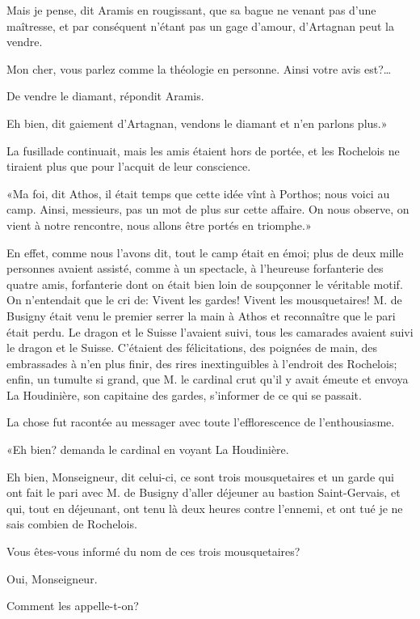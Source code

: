 \speak  Mais je pense, dit Aramis en rougissant, que sa bague ne venant pas d'une maîtresse, et par conséquent n'étant pas un gage d'amour, d'Artagnan peut la vendre. 

\speak  Mon cher, vous parlez comme la théologie en personne. Ainsi votre avis est?\dots 

\speak  De vendre le diamant, répondit Aramis. 

\speak  Eh bien, dit gaiement d'Artagnan, vendons le diamant et n'en parlons plus.» 

La fusillade continuait, mais les amis étaient hors de portée, et les Rochelois ne tiraient plus que pour l'acquit de leur conscience. 

«Ma foi, dit Athos, il était temps que cette idée vînt à Porthos; nous voici au camp. Ainsi, messieurs, pas un mot de plus sur cette affaire. On nous observe, on vient à notre rencontre, nous allons être portés en triomphe.» 

En effet, comme nous l'avons dit, tout le camp était en émoi; plus de deux mille personnes avaient assisté, comme à un spectacle, à l'heureuse forfanterie des quatre amis, forfanterie dont on était bien loin de soupçonner le véritable motif. On n'entendait que le cri de: Vivent les gardes! Vivent les mousquetaires! M. de Busigny était venu le premier serrer la main à Athos et reconnaître que le pari était perdu. Le dragon et le Suisse l'avaient suivi, tous les camarades avaient suivi le dragon et le Suisse. C'étaient des félicitations, des poignées de main, des embrassades à n'en plus finir, des rires inextinguibles à l'endroit des Rochelois; enfin, un tumulte si grand, que M. le cardinal crut qu'il y avait émeute et envoya La Houdinière, son capitaine des gardes, s'informer de ce qui se passait. 

La chose fut racontée au messager avec toute l'efflorescence de l'enthousiasme. 

«Eh bien? demanda le cardinal en voyant La Houdinière. 

\speak  Eh bien, Monseigneur, dit celui-ci, ce sont trois mousquetaires et un garde qui ont fait le pari avec M. de Busigny d'aller déjeuner au bastion Saint-Gervais, et qui, tout en déjeunant, ont tenu là deux heures contre l'ennemi, et ont tué je ne sais combien de Rochelois. 

\speak  Vous êtes-vous informé du nom de ces trois mousquetaires? 

\speak  Oui, Monseigneur. 

\speak  Comment les appelle-t-on? 

